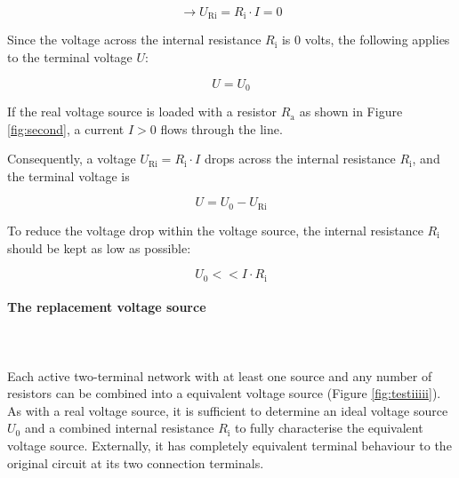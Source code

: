 \begin{frame}
{		\begin{equation*}
			\rightarrow U_\mathrm{Ri} = R_\mathrm{i} \cdot I = 0
		\end{equation*}
		
		Since the voltage across the internal resistance $R_\mathrm{i}$ is 0 volts, the following applies to the terminal voltage $U$:
		
		\begin{equation*}
			U = U_0
		\end{equation*}
		
		If the real voltage source is loaded with a resistor $R_\mathrm{a}$ as shown in Figure \ref{fig:second},
		a current $I > 0$ flows through the line.
		
		Consequently, a voltage $U_\mathrm{Ri} = R_\mathrm{i} \cdot I$ drops across the internal resistance $R_\mathrm{i}$, and the terminal voltage
		is
		
		\begin{equation*}
			U = U_0 - U_\mathrm{Ri}
		\end{equation*}
		
		To reduce the voltage drop within the voltage source, the 
		internal resistance $R_\mathrm{i}$ should be kept as low as possible:
		
		\begin{equation*}
			U_0 << I \cdot R_\mathrm{i}
		\end{equation*}
		
		
		
		\paragraph{The replacement voltage source}\\
		
		\phantom{text}\\
		
		
		
		Each active two-terminal network with at least one source and any number of resistors can be combined into a
        equivalent voltage source (Figure \ref{fig:testiiiii}). As with a real voltage source, it is sufficient to determine an
		ideal voltage source $U_0$ and a combined internal resistance $R_\mathrm{i}$ to 
		fully characterise the equivalent voltage source.
		Externally, it has completely equivalent terminal behaviour to the original circuit at
		its two connection terminals.
		
		
		\begin{figure}[h!]
			\renewcommand{\figurename}{Figure}
			

\end{figure}}
\end{frame}

